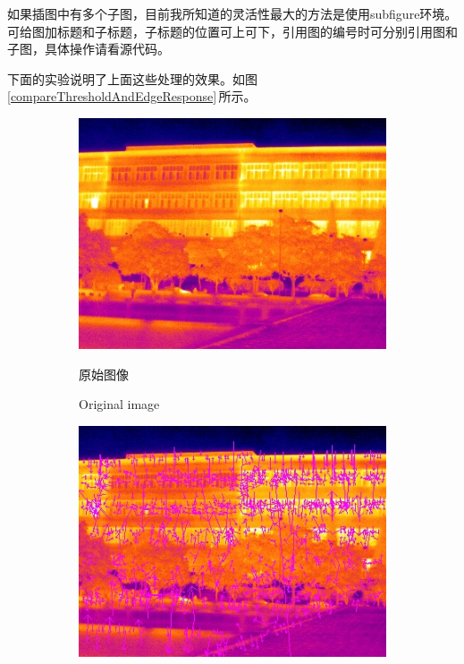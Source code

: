 \documentclass[10.5pt,a4paper]{article}
\numberwithin{equation}{section}
\numberwithin{figure}{section}
\numberwithin{table}{section}
\begin{document}
如果插图中有多个子图，目前我所知道的灵活性最大的方法是使用subfigure环境。
可给图加标题和子标题，子标题的位置可上可下，引用图的编号时可分别引用图和子图，具体操作请看源代码。
\par
下面的实验说明了上面这些处理的效果。如图\,\ref{compareThresholdAndEdgeResponse}\,所示。
\begin{figure}[htbp]
\centering
	\begin{subfigure}[b]{.4\textwidth}
		\centering
				\includegraphics[width=\textwidth]{useful/compareEdgeResponse/12.jpg}
				\caption{原始图像\label{originalZhulou}}
				\addtocounter{subfigure}{-1}
				\caption{Original image}
	\end{subfigure}
	\qquad
	\begin{subfigure}[b]{.4\textwidth}
		\centering
				\includegraphics[width=\textwidth]{useful/compareEdgeResponse/siftFeature1301.jpg}

\end{subfigure}
\end{figure}
\end{document}
